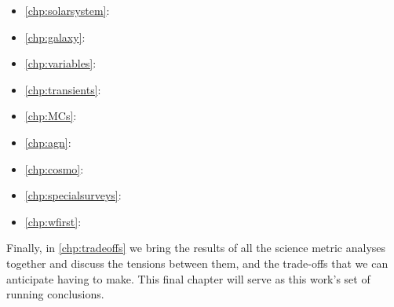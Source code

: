\begin{itemize}
    \item \autoref{chp:solarsystem}: 
    \item \autoref{chp:galaxy}: 
    \item \autoref{chp:variables}: 
    \item \autoref{chp:transients}: 
    \item \autoref{chp:MCs}: 
    \item \autoref{chp:agn}: 
    \item \autoref{chp:cosmo}: 
    \item \autoref{chp:specialsurveys}: 
    \item \autoref{chp:wfirst}: 
\end{itemize}

Finally, in \autoref{chp:tradeoffs} we bring the results of all the
science metric analyses  together and discuss the tensions between
them, and the trade-offs that we can anticipate having to make.
This final chapter will serve as this work's set of running conclusions.


\navigationbar



%
%
%
%
%
%
%
%
% 
%
